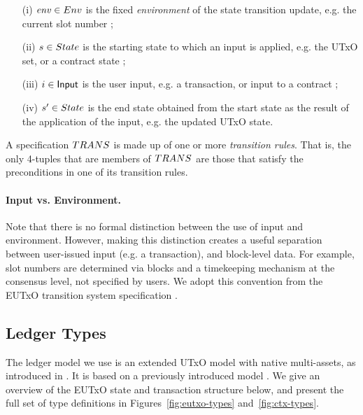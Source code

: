 \begin{itemize}
  \item[(i)] $\var{env} \in \Env$ is the fixed \emph{environment} of the state transition
  update, e.g. the current slot number ;

  \item[(ii)] $s \in \State$ is the starting state
  to which an input is applied, e.g. the UTxO set, or a contract state ;

  \item[(iii)] $i \in \textsf{Input}$ is the user input, e.g. a transaction, or input to
  a contract ;

  \item[(iv)] $s' \in \State$ is the end state
  obtained from the start state as the result of the application of the input,
  e.g. the updated UTxO state.
\end{itemize}

A specification $\TRANS$ is made up of one or more
\emph{transition rules}. That is, the only 4-tuples that are members of $\TRANS$ are those that
satisfy the preconditions in one of its transition rules.

\paragraph{Input vs. Environment. }

Note that there is no formal distinction between the use of input and environment.
However, making this distinction creates a useful separation between user-issued
input (e.g. a transaction), and block-level data. For example, slot numbers are
determined via blocks and a timekeeping mechanism at the consensus level,
not specified by users. We adopt this convention from the
EUTxO transition system specification \cite{alonzo}.


\subsection{Ledger Types}

The ledger model we use is an extended UTxO model with native multi-assets,
as introduced in \cite{structured}. It is based on
a previously introduced model
\cite{eutxoma}. We give an overview of the EUTxO state and transaction structure
below, and present the full set of type definitions
in Figures~\ref{fig:eutxo-types} and~\ref{fig:ctx-types}.

